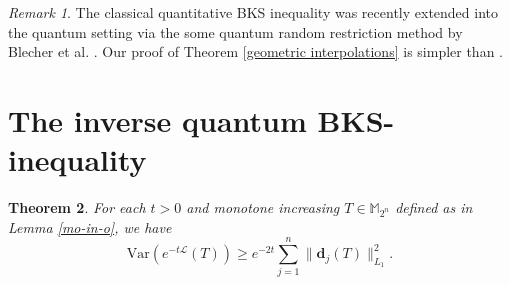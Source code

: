 \documentclass{amsbook}
\newtheorem{theorem}{Theorem}[chapter]
\theoremstyle{definition}
\theoremstyle{remark}
\newtheorem{remark}[theorem]{Remark}
\numberwithin{section}{chapter}
\numberwithin{equation}{chapter}
\newcommand{\M}{\mathbb{M}}
\newcommand{\1}{\mathbf{1}}
\newcommand{\dc}{\mathbf{d}}
\begin{document}
\begin{remark}
 The classical quantitative BKS inequality  \cite[Theorem 4]{KK2013} was recently extended into the quantum setting via the some quantum random restriction method by Blecher et al. \cite{BGX2025}. Our proof of Theorem \ref{geometric interpolations} is simpler than \cite{BGX2025}. 
\end{remark}

\section{The inverse quantum BKS-inequality}
\begin{theorem}
	For each $t>0$ and monotone increasing $T\in \M_{2^{n}}$ defined as in Lemma \ref{mo-in-o}, we have
	\begin{equation}\label{inverse BKS}
		\mathrm{Var}\left(e^{-t\mathcal{L}}(T)\right)\geq e^{-2t}\sum_{j=1}^{n}\|\dc_{j}(T)\|^{2}_{L_{1}}.
	\end{equation}
\end{theorem}
\end{document}
